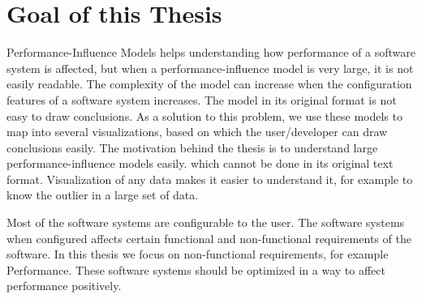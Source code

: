 
\todots

\section{Goal of this Thesis}
Performance-Influence Models helps understanding how performance of a software system is affected, but when a performance-influence model is very large, it is not easily readable. The complexity of the model can increase when the configuration features of a software system increases.
The model in its original format is not easy to draw conclusions.
As a solution to this problem, we use these models to map into several visualizations, based on which the user/developer can draw conclusions easily.
The motivation behind the thesis is to understand large performance-influence models easily. which cannot be done in its original text format.
Visualization of any data makes it easier to understand it, for example to know the outlier in a large set of data.

Most of the software systems are configurable to the user. The  software systems when configured affects certain functional and non-functional requirements of the software. In this thesis we focus on non-functional requirements, for example Performance. These software systems should be optimized in a way to affect performance positively.



\todots 

